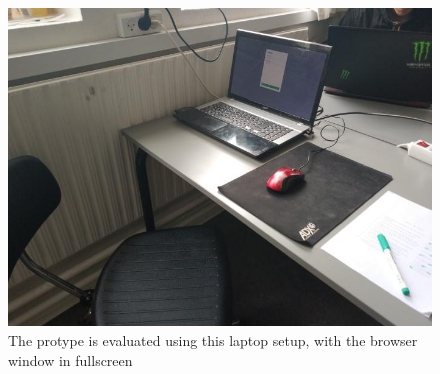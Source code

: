 \begin{figure}[H]
    \centering
    \includegraphics[width=0.75\linewidth]{InteraktionsDesign/Assets/Illustrationer/opstilling.jpg}
    \caption{The protype is evaluated using this laptop setup, with the browser window in fullscreen}
    \label{fig:protypesetup}
\end{figure}

